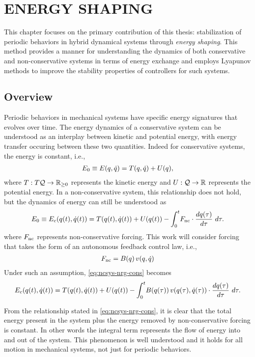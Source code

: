 \chapter{\uppercase{Energy Shaping}}

This chapter focuses on the primary contribution of this thesis: stabilization
of periodic behaviors in hybrid dynamical systems through {\em energy shaping}.
%
This method provides a manner for understanding the dynamics of both
conservative and  non-conservative systems in terms of energy exchange and
employs Lyapunov methods to improve the stability properties of controllers for
such systems.
%

\section{Overview}

Periodic behaviors in mechanical systems have specific energy signatures that
evolves over time.
%
The energy dynamics of a conservative system can be understood as an interplay
between kinetic and potential energy, with energy transfer occuring between
these two quantities.
%
Indeed for conservative systems, the energy is constant, i.e.,
\begin{align}
  E_{0} \equiv E(q, \dot{q}) = T(q, \dot{q}) + U(q),
\end{align}
where $T : T\mathcal{Q} \to \mathbb{R}_{\geq 0}$ represents the kinetic energy and $U : \mathcal{Q} \to \mathbb{R}$
represents the potential energy.
%
In a non-conservative system, this relationship does not hold, but the dynamics
of energy can still be understood as
\begin{align}
  \label{eq:ncsys-nrg-cons}
  E_{0} \equiv E_{c}(q(t), \dot{q}(t)) = T(q(t), \dot{q}(t)) + U(q(t)) - \int_{0}^{t} \! F_{\mathrm{nc}} \cdot \frac{dq(\tau)}{d\tau} \ d\tau.
\end{align}
where $F_{\mathrm{nc}}$ represents non-conservative forcing.
%
This work will consider forcing that takes the form of an autonomous feedback
control law, i.e.,
\begin{align}
  F_{\mathrm{nc}} = B(q) \, v(q, \dot{q})
\end{align}
%
Under such an assumption, \eqref{eq:ncsys-nrg-cons} becomes
\begin{align}
  E_{c}(q(t), \dot{q}(t)) = T(q(t), \dot{q}(t)) + U(q(t)) - \int_{0}^{t} \!
  B(q(\tau)) \, v(q(\tau), \dot{q}(\tau)) \cdot \frac{dq(\tau)}{d\tau} \ d\tau.
\end{align}

From the relationship stated in \eqref{eq:ncsys-nrg-cons}, it is clear that the
total energy present in the system plus the energy removed by non-conservative
forcing is constant.
%
In other words the integral term represents the flow of energy into and out of
the system.
%
This phenomenon is well understood and it holds for all motion in mechanical
systems, not just for periodic behaviors.

